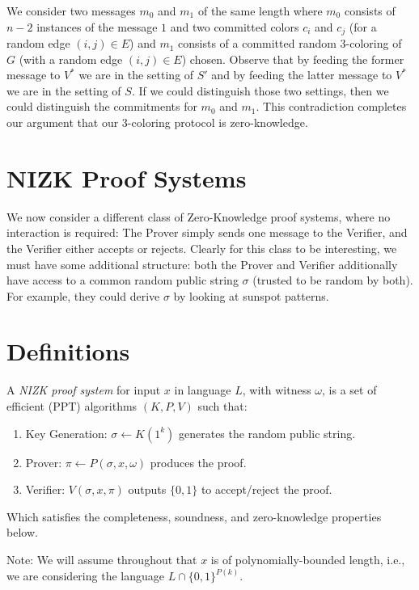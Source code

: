 \documentclass[12pt]{tufte-book}
\begin{document}
We consider two messages $m_0$ and $m_1$ of the same length where $m_0$ consists of $n-2$ instances of the message $1$ and two committed colors $c_i$ and $c_j$ (for a random edge $(i, j) \in E$) and $m_1$ consists of a committed random 3-coloring of $G$ (with a random edge $(i, j) \in E$) chosen. Observe that by feeding the former message to $V^*$ we are in the setting of $S'$ and by feeding the latter message to $V^*$ we are in the setting of $S$. If we could distinguish those two settings, then we could distinguish the commitments for $m_0$ and $m_1$. This contradiction completes our argument that our 3-coloring protocol is zero-knowledge.














 
\newcommand{\rgets}{\overset{\$}{\gets}}
\section{NIZK Proof Systems}
We now consider a different class of Zero-Knowledge proof systems, where no
interaction is required: The Prover simply sends one message to the Verifier,
and the Verifier either accepts or rejects. Clearly for this class to be
interesting, we must have some additional structure:
both the Prover and Verifier additionally have access to a common random public string
$\sigma$ (trusted to be random by both). For example, they could derive $\sigma$
by looking at sunspot patterns. 

\section{Definitions}

\begin{definition}
    A \emph{NIZK proof system} for input $x$ in language $L$, with witness $\omega$, is a set of
efficient (PPT) algorithms $(K, P, V)$ such that:
\begin{enumerate}
    \item Key Generation: $\sigma \gets K(1^k)$ generates the random public string.
    \item Prover: $\pi \gets P(\sigma, x, \omega)$ produces the proof.
    \item Verifier: $V(\sigma, x, \pi)$ outputs $\{0, 1\}$ to accept/reject the proof.
\end{enumerate}
Which satisfies the completeness, soundness, and zero-knowledge properties below.
\end{definition}
Note: We will assume throughout that $x$ is of polynomially-bounded length, i.e., we are
considering the language $L \cap \{0, 1\}^{P(k)}$.
\end{document}
